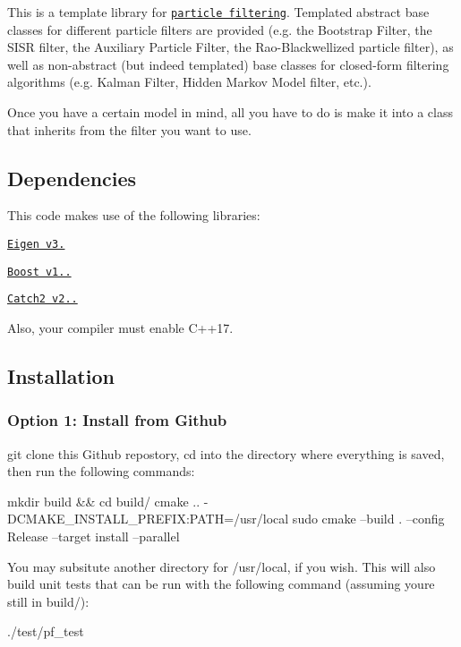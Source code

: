 \href{https://zenodo.org/badge/latestdoi/130237492}{\tt }

This is a template library for \href{https://en.wikipedia.org/wiki/Particle_filter}{\tt particle filtering}. Templated abstract base classes for different particle filters are provided (e.\+g. the Bootstrap Filter, the S\+I\+SR filter, the Auxiliary Particle Filter, the Rao-\/\+Blackwellized particle filter), as well as non-\/abstract (but indeed templated) base classes for closed-\/form filtering algorithms (e.\+g. Kalman Filter, Hidden Markov Model filter, etc.).

Once you have a certain model in mind, all you have to do is make it into a class that inherits from the filter you want to use.

\subsection*{Dependencies}

This code makes use of the following libraries\+:


\begin{DoxyItemize}
\item \href{http://eigen.tuxfamily.org/}{\tt Eigen v3.}
\item \href{https://www.boost.org/}{\tt Boost v1..}
\item \href{https://github.com/catchorg/Catch2}{\tt Catch2 v2..}
\end{DoxyItemize}

Also, your compiler must enable C++17.

\subsection*{Installation}

\subsubsection*{Option 1\+: Install from Github}

{\ttfamily git clone} this Github repostory, {\ttfamily cd} into the directory where everything is saved, then run the following commands\+: \begin{DoxyVerb}mkdir build && cd build/
cmake .. -DCMAKE_INSTALL_PREFIX:PATH=/usr/local
sudo cmake --build . --config Release --target install --parallel
\end{DoxyVerb}


You may subsitute another directory for {\ttfamily /usr/local}, if you wish. This will also build unit tests that can be run with the following command (assuming you\textquotesingle{}re still in {\ttfamily build/})\+: \begin{DoxyVerb}./test/pf_test
\end{DoxyVerb}


